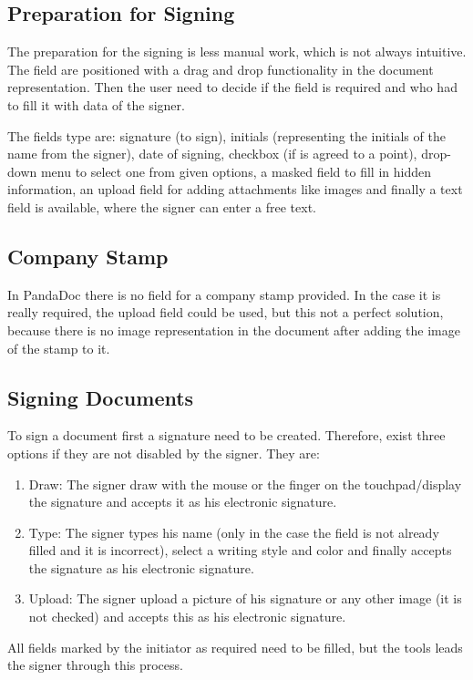 \subsection{Preparation for Signing}
The preparation for the signing is less manual work, which is not always intuitive. The field are positioned with a drag and drop functionality in the document representation. Then the user need to decide if the field is required and who had to fill it with data of the signer.

The fields type are: signature (to sign), initials (representing the initials of the name from the signer), date of signing, checkbox (if is agreed to a point), drop-down menu to select one from given options, a masked field to fill in hidden information, an upload field for adding attachments like images and finally a text field is available, where the signer can enter a free text.

\subsection{Company Stamp}
In PandaDoc there is no field for a company stamp provided. In the case it is really required, the upload field could be used, but this not a perfect solution, because there is no image representation in the document after adding the image of the stamp to it.

\subsection{Signing Documents}
To sign a document first a signature need to be created. Therefore, exist three options if they are not disabled by the signer. They are:
\begin{enumerate}
	\item Draw: The signer draw with the mouse or the finger on the touchpad/display the signature and accepts it as his electronic signature.
	\item Type: The signer types his name (only in the case the field is not already filled and it is incorrect), select a writing style and color and finally accepts the signature as his electronic signature.
	\item Upload: The signer upload a picture of his signature or any other image (it is not checked) and accepts this as his electronic signature.
\end{enumerate}
All fields marked by the initiator as required  need to be filled, but the tools leads the signer through this process.

